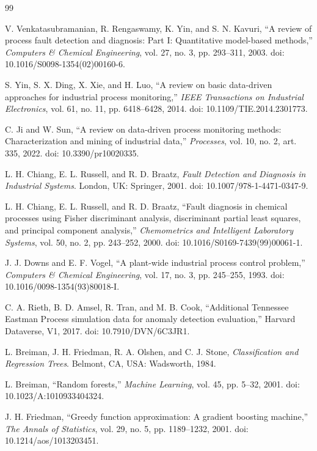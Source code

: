 \documentclass[12pt,a4paper]{article}
\begin{document}
\begin{thebibliography}{99}

V. Venkatasubramanian, R. Rengaswamy, K. Yin, and S. N. Kavuri,
``A review of process fault detection and diagnosis: Part I: Quantitative
model-based methods,'' \emph{Computers \& Chemical Engineering}, vol. 27,
no. 3, pp. 293--311, 2003. doi: 10.1016/S0098-1354(02)00160-6.

S. Yin, S. X. Ding, X. Xie, and H. Luo,
``A review on basic data-driven approaches for industrial process monitoring,''
\emph{IEEE Transactions on Industrial Electronics}, vol. 61, no. 11,
pp. 6418--6428, 2014. doi: 10.1109/TIE.2014.2301773.

C. Ji and W. Sun,
``A review on data-driven process monitoring methods: Characterization and
mining of industrial data,'' \emph{Processes}, vol. 10, no. 2, art. 335,
2022. doi: 10.3390/pr10020335.

L. H. Chiang, E. L. Russell, and R. D. Braatz,
\emph{Fault Detection and Diagnosis in Industrial Systems}. London, UK:
Springer, 2001. doi: 10.1007/978-1-4471-0347-9.

L. H. Chiang, E. L. Russell, and R. D. Braatz,
``Fault diagnosis in chemical processes using Fisher discriminant analysis,
discriminant partial least squares, and principal component analysis,''
\emph{Chemometrics and Intelligent Laboratory Systems}, vol. 50, no. 2,
pp. 243--252, 2000. doi: 10.1016/S0169-7439(99)00061-1.

J. J. Downs and E. F. Vogel,
``A plant-wide industrial process control problem,''
\emph{Computers \& Chemical Engineering}, vol. 17, no. 3, pp. 245--255,
1993. doi: 10.1016/0098-1354(93)80018-I.

C. A. Rieth, B. D. Amsel, R. Tran, and M. B. Cook,
``Additional Tennessee Eastman Process simulation data for anomaly detection
evaluation,'' Harvard Dataverse, V1, 2017.
doi: 10.7910/DVN/6C3JR1.

L. Breiman, J. H. Friedman, R. A. Olshen, and C. J. Stone,
\emph{Classification and Regression Trees}. Belmont, CA, USA: Wadsworth, 1984.

L. Breiman, ``Random forests,'' \emph{Machine Learning}, vol. 45,
pp. 5--32, 2001. doi: 10.1023/A:1010933404324.

J. H. Friedman, ``Greedy function approximation: A gradient boosting machine,''
\emph{The Annals of Statistics}, vol. 29, no. 5, pp. 1189--1232, 2001.
doi: 10.1214/aos/1013203451.


\end{thebibliography}
\end{document}
